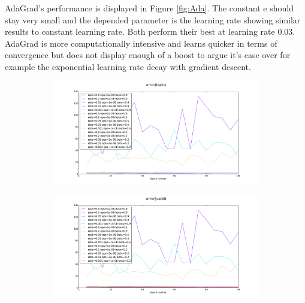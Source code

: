 \documentclass[12pt]{article}
\begin{document}
AdaGrad's performance is displayed in Figure \ref{fig:Ada}. The constant e should stay very small and the depended parameter is the learning rate showing similar results to constant learning rate. Both perform their best at learning rate 0.03. AdaGrad is more computationally intensive and learns quicker in terms of convergence but does not display enough of a boost to argue it's case over for example the exponential learning rate decay with gradient descent.

\begin{figure}[h]
\centering
\begin{subfigure}{.5\textwidth}
  \centering
  \includegraphics[width=9.1cm]{Task3/figures/Rms_error(train).pdf}
\end{subfigure}%
\begin{subfigure}{.5\textwidth}
  \centering
  \includegraphics[width=9.1cm]{Task3/figures/Rms_error(valid).pdf}
\end{subfigure}%
\end{figure}
\end{document}
